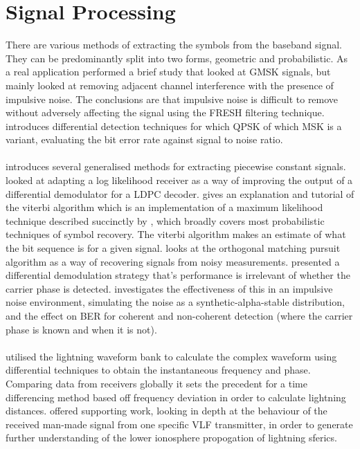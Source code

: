 \section{Signal Processing}
There are various methods of extracting the symbols from the baseband signal. They can be predominantly split into two forms, geometric and probabilistic. 
As a real application \cite{Adlard1999} performed a brief study that looked at GMSK signals, but mainly looked at removing adjacent channel interference with the presence of impulsive noise. The conclusions are that impulsive noise is difficult to remove without adversely affecting the signal using the FRESH filtering technique.
\cite{Park2011} introduces differential detection techniques for which QPSK of which MSK is a variant, evaluating the bit error rate against signal to noise ratio.
\\\\
\cite{Little2011} introduces several generalised methods for extracting piecewise constant signals.
\cite{Wiklundh2015} looked at adapting a log likelihood receiver as a way of improving the output of a differential demodulator for a LDPC decoder. \cite{Forney1973} gives an explanation and tutorial of the viterbi algorithm which is an implementation of a maximum likelihood technique described succinctly by \cite{weisstein}, which broadly covers most probabilistic techniques of symbol recovery. The viterbi algorithm makes an estimate of what the bit sequence is for a given signal. \cite{Shen2015} looks at the orthogonal matching pursuit algorithm as a way of recovering signals from noisy measurements. \cite{Yue2016} presented a differential demodulation strategy that's performance is irrelevant of whether the carrier phase is detected. \cite{Yang2016} investigates the effectiveness of this in an impulsive noise environment, simulating the noise as a synthetic-alpha-stable distribution, and the effect on BER for coherent and non-coherent detection (where the carrier phase is known and when it is not). 
\\\\
\cite{Liu2018} utilised the lightning waveform bank to calculate the complex waveform using differential techniques to obtain the instantaneous frequency and phase. Comparing data from receivers globally it sets the precedent for a time differencing method based off frequency deviation in order to calculate lightning distances. \cite{Koh2018} offered supporting work, looking in depth at the behaviour of the received man-made signal from one specific VLF transmitter, in order to generate further understanding of the lower ionosphere propogation of lightning sferics.

